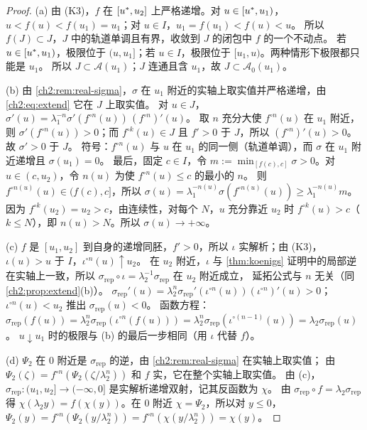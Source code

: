 \begin{proof}
(a) 由 (K3)，$f$ 在 $[u^{*},u_2]$ 上严格递增。对 $u\in[u^{*},u_1)$，$u<f(u)<f(u_1)=u_1$；对 $u\in I$，$u_1=f(u_1)<f(u)<u$。
所以 $f(J)\subset J$，$J$ 中的轨道单调且有界，收敛到 $J$ 的闭包中 $f$ 的一个不动点。
若 $u\in[u^{*},u_1)$，极限位于 $(u,u_1]$；若 $u\in I$，极限位于 $[u_1,u)$。两种情形下极限都只能是 $u_1$。
所以 $J\subset\mathcal A(u_1)$；$J$ 连通且含 $u_1$，故 $J\subset\mathcal A_0(u_1)$。

(b) 由 \cref{ch2:rem:real-sigma}，$\sigma$ 在 $u_1$ 附近的实轴上取实值并严格递增，由 \eqref{ch2:eq:extend} 它在 $J$ 上取实值。
对 $u\in J$，$\sigma'(u)=\lambda_1^{-n}\sigma'(f^{\circ n}(u))\,(f^{\circ n})'(u)$。
取 $n$ 充分大使 $f^{\circ n}(u)$ 在 $u_1$ 附近，则 $\sigma'(f^{\circ n}(u))>0$；而 $f^{\circ k}(u)\in J$ 且 $f'>0$ 于 $J$，所以 $(f^{\circ n})'(u)>0$。故 $\sigma'>0$ 于 $J$。
符号：$f^{\circ n}(u)$ 与 $u$ 在 $u_1$ 的同一侧（轨道单调），而 $\sigma$ 在 $u_1$ 附近递增且 $\sigma(u_1)=0$。
最后，固定 $c\in I$，令 $m:=\min_{[f(c),c]}\sigma>0$。对 $u\in(c,u_2)$，令 $n(u)$ 为使 $f^{\circ n}(u)\le c$ 的最小的 $n$。
则 $f^{\circ n(u)}(u)\in(f(c),c]$，所以 $\sigma(u)=\lambda_1^{-n(u)}\sigma(f^{\circ n(u)}(u))\ge\lambda_1^{-n(u)}m$。
因为 $f^{\circ k}(u_2)=u_2>c$，由连续性，对每个 $N$，$u$ 充分靠近 $u_2$ 时 $f^{\circ k}(u)>c$（$k\le N$），即 $n(u)>N$。所以 $\sigma(u)\to+\infty$。

(c) $f$ 是 $[u_1,u_2]$ 到自身的递增同胚，$f'>0$，所以 $\iota$ 实解析；由 (K3)，$\iota(u)>u$ 于 $I$，$\iota^{\circ n}(u)\uparrow u_2$。
在 $u_2$ 附近，$\iota$ 与 \cref{thm:koenigs} 证明中的局部逆在实轴上一致，所以 $\sigma_{\mathrm{rep}}\circ \iota=\lambda_2^{-1}\sigma_{\mathrm{rep}}$ 在 $u_2$ 附近成立，
延拓公式与 $n$ 无关（同 \cref{ch2:prop:extend}(b)）。
$\sigma_{\mathrm{rep}}'(u)=\lambda_2^n\sigma_{\mathrm{rep}}'(\iota^{\circ n}(u))(\iota^{\circ n})'(u)>0$；$\iota^{\circ n}(u)<u_2$ 推出 $\sigma_{\mathrm{rep}}(u)<0$。
函数方程：$\sigma_{\mathrm{rep}}(f(u))=\lambda_2^{n}\sigma_{\mathrm{rep}}(\iota^{\circ n}(f(u)))=\lambda_2^n\sigma_{\mathrm{rep}}(\iota^{\circ(n-1)}(u))=\lambda_2\sigma_{\mathrm{rep}}(u)$。
$u\downarrow u_1$ 时的极限与 (b) 的最后一步相同（用 $\iota$ 代替 $f$）。

(d) $\Psi_2$ 在 $0$ 附近是 $\sigma_{\mathrm{rep}}$ 的逆，由 \cref{ch2:rem:real-sigma} 在实轴上取实值；
由 $\Psi_2(\zeta)=f^{\circ n}(\Psi_2(\zeta/\lambda_2^n))$ 和 $f$ 实，它在整个实轴上取实值。
由 (c)，$\sigma_{\mathrm{rep}}:(u_1,u_2]\to(-\infty,0]$ 是实解析递增双射，记其反函数为 $\chi$。
由 $\sigma_{\mathrm{rep}}\circ f=\lambda_2\sigma_{\mathrm{rep}}$ 得 $\chi(\lambda_2y)=f(\chi(y))$。在 $0$ 附近 $\chi=\Psi_2$，所以对 $y\le0$，
$\Psi_2(y)=f^{\circ n}(\Psi_2(y/\lambda_2^n))=f^{\circ n}(\chi(y/\lambda_2^n))=\chi(y)$。
\end{proof}

